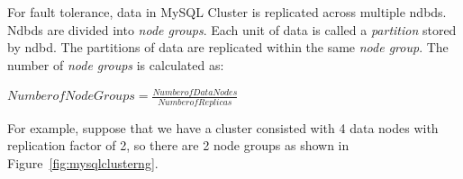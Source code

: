 \noindent For fault tolerance, data in MySQL Cluster is replicated across multiple ndbds. Ndbds are divided into \textit{node groups}. Each unit of data is called a \textit{partition} stored by ndbd. The partitions of data are replicated within the same \textit{node group}. The number of \textit{node groups} is calculated as:

\begin{center}
	$Number of Node Groups = \frac{Number of Data Nodes}{Number of Replicas}$
\end{center}

\noindent For example, suppose that we have a cluster consisted with 4 data nodes with replication factor of 2, so there are 2 node groups as shown in Figure~\ref{fig:mysqlclusterng}.

\begin{figure}
	\centering     %

\end{figure}
